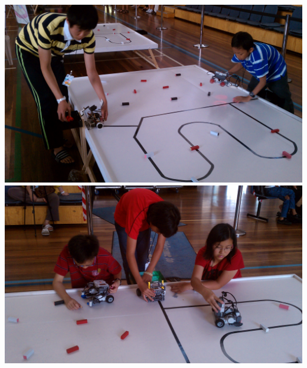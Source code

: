 \documentclass[12pt]{hurocup}
\begin{document}
\begin{center}
\includegraphics[width=0.7\linewidth]{Figures/mission_challenge}
\includegraphics[width=0.7\linewidth]{Figures/mission_challenge2}
\end{center}
\end{document}
